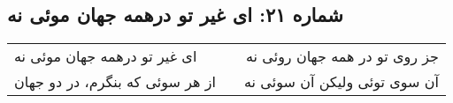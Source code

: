 \begin{center}
\section*{شماره ۲۱: ای غیر تو درهمه جهان موئی نه}
\label{sec:021}
\begin{longtable}{l p{0.5cm} r}
ای غیر تو درهمه جهان موئی نه
&&
جز روی تو در همه جهان روئی نه
\\
از هر سوئی که بنگرم، در دو جهان
&&
آن سوی توئی ولیکن آن سوئی نه
\\
\end{longtable}
\end{center}
